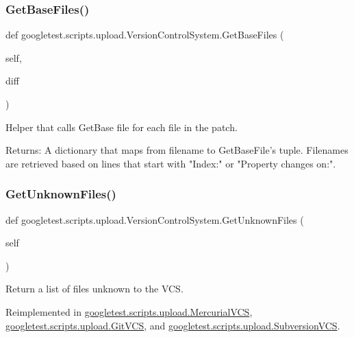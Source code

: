 \subsubsection{\texorpdfstring{GetBaseFiles()}{GetBaseFiles()}}
{\footnotesize\ttfamily def googletest.\+scripts.\+upload.\+Version\+Control\+System.\+Get\+Base\+Files (\begin{DoxyParamCaption}\item[{}]{self,  }\item[{}]{diff }\end{DoxyParamCaption})}

\begin{DoxyVerb}Helper that calls GetBase file for each file in the patch.

Returns:
  A dictionary that maps from filename to GetBaseFile's tuple.  Filenames
  are retrieved based on lines that start with "Index:" or
  "Property changes on:".
\end{DoxyVerb}
 \mbox{\label{classgoogletest_1_1scripts_1_1upload_1_1_version_control_system_a65c6bfa5a25cadeaa54866c6d3cf9da3}} 
\subsubsection{\texorpdfstring{GetUnknownFiles()}{GetUnknownFiles()}}
{\footnotesize\ttfamily def googletest.\+scripts.\+upload.\+Version\+Control\+System.\+Get\+Unknown\+Files (\begin{DoxyParamCaption}\item[{}]{self }\end{DoxyParamCaption})}

\begin{DoxyVerb}Return a list of files unknown to the VCS.\end{DoxyVerb}
 

Reimplemented in \mbox{\hyperlink{classgoogletest_1_1scripts_1_1upload_1_1_mercurial_v_c_s_ae616fb90f66bc9060d4e0637dc5ac9a6}{googletest.\+scripts.\+upload.\+Mercurial\+V\+CS}}, \mbox{\hyperlink{classgoogletest_1_1scripts_1_1upload_1_1_git_v_c_s_adbbe5f9ce57c362cc9e79e270c39ab54}{googletest.\+scripts.\+upload.\+Git\+V\+CS}}, and \mbox{\hyperlink{classgoogletest_1_1scripts_1_1upload_1_1_subversion_v_c_s_ac112319b31bf62e78d21c4416f5dad25}{googletest.\+scripts.\+upload.\+Subversion\+V\+CS}}.

